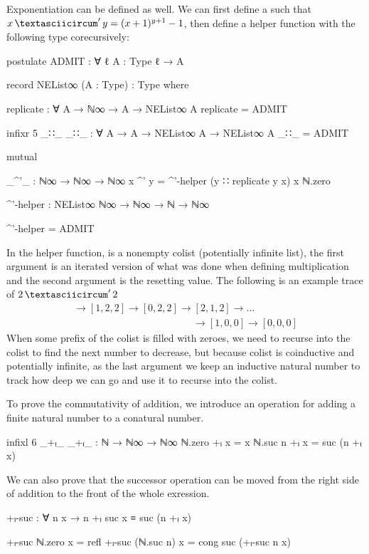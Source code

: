 Exponentiation can be defined as well. We can first define a
 such that $x \mathop{\textasciicircum}' y =
(x+1)^{y+1}-1$, then define a helper function with the following type
corecursively:
\begin{code}[hide]
postulate
  ADMIT : ∀ {ℓ} {A : Type ℓ} → A

record NEList∞ (A : Type) : Type where

replicate : ∀ {A} → ℕ∞ → A → NEList∞ A
replicate = ADMIT

infixr 5 _∷_
_∷_ : ∀ {A} → A → NEList∞ A → NEList∞ A
_∷_ = ADMIT

mutual
\end{code}
\begin{code}
  _^'_ : ℕ∞ → ℕ∞ → ℕ∞
  x ^' y = ^'-helper (y ∷ replicate y x) x ℕ.zero

  ^'-helper : NEList∞ ℕ∞ → ℕ∞ → ℕ → ℕ∞
\end{code}
\begin{code}[hide]
  ^'-helper = ADMIT
\end{code}
In the helper function,  is a nonempty colist (potentially
infinite list), the first argument is an iterated version of what was done when
defining multiplication and the second argument is the resetting value. The
following is an example trace of $2 \mathop{\textasciicircum}' 2$
\begin{gather*}
  [2, 2, 2] \to [1, 2, 2] \to [0, 2, 2] \to [2, 1, 2] \to \dots \\
  \qquad\qquad\qquad\qquad\qquad\qquad\to [1, 0, 0] \to [0, 0, 0]
\end{gather*}
When some prefix of the colist is filled with zeroes, we need to recurse into
the colist to find the next number to decrease, but because colist is
coinductive and potentially infinite, as the last argument we keep an inductive
natural number to track how deep we can go and use it to recurse into the
colist.

To prove the commutativity of addition, we introduce an operation for adding a
finite natural number to a conatural number.
\begin{code}
infixl 6 _+ₗ_
_+ₗ_ : ℕ → ℕ∞ → ℕ∞
ℕ.zero +ₗ x = x
ℕ.suc n +ₗ x = suc (n +ₗ x)
\end{code}
We can also prove that the successor operation can be moved from the right side
of addition to the front of the whole exression.
\begin{code}
+ₗ-suc : ∀ n x → n +ₗ suc x ≡ suc (n +ₗ x)
\end{code}
\begin{code}[hide]
+ₗ-suc ℕ.zero x = refl
+ₗ-suc (ℕ.suc n) x = cong suc (+ₗ-suc n x)
\end{code}

